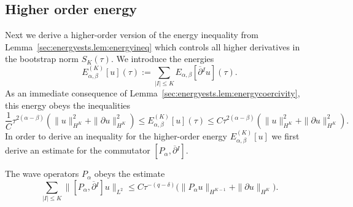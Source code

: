 \documentclass{article}
\newcommand{\ol}{\overline}
\newcommand{\pa}{\partial}
\begin{document}
\subsection{Higher order energy}
Next we derive a higher-order version of the energy inequality from Lemma~\ref{sec:energyests.lem:energyineq} which controls all higher derivatives in the bootstrap norm $S_K(\tau)$. We introduce the energies
\begin{equation}\label{sec:energyests.eq:energyhodef}
    E_{\alpha,\beta}^{(K)}[u](\tau):= \sum_{|I|\leq K}E_{\alpha,\beta}[\ol{\pa}{}^I u](\tau).
\end{equation}
As an immediate consequence of Lemma~\ref{sec:energyests.lem:energycoercivity}, this energy obeys the inequalities
\begin{equation}\label{sec:energyests.eq:energyhocoercivity}
    \frac{1}{C}\tau^{2(\alpha-\beta)} (\|u\|_{H^K}^2 + \|\pa u\|_{H^K}^2) \leq E_{\alpha,\beta}^{(K)}[u](\tau) \leq C\tau^{2(\alpha-\beta)} (\|u\|_{H^K}^2 + \|\pa u\|_{H^K}^2).
\end{equation}
In order to derive an inequality for the higher-order energy $E_{\alpha,\beta}^{(K)}[u]$ we first derive an estimate for the commutator $[P_\alpha,\ol{\pa}{}^I]$.
\begin{lemma}\label{sec:energyests.lem:wavecom}
    The wave operators $P_\alpha$ obeys the estimate
    \begin{equation}\label{sec:energyests.eq:wavecom}
        \sum_{|I|\leq K}\|[P_\alpha, \ol{\pa}{}^I]u\|_{L^2} \leq C\tau^{-(q-\delta)}\Big(\|P_\alpha u\|_{H^{K-1}} + \|\pa u\|_{H^K} \Big).
    \end{equation}
\end{lemma}
\end{document}

